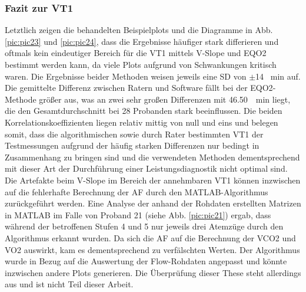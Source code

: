 \subsubsection{Fazit zur VT1}
%
Letztlich zeigen die behandelten Beispielplots und die Diagramme in Abb. \ref{pic:pic23} und \ref{pic:pic24}, dass die Ergebnisse häufiger stark differieren und oftmals kein eindeutiger Bereich für die VT1 mittels V-Slope und \gls{EQO2} bestimmt werden kann, da viele Plots aufgrund von Schwankungen kritisch waren. Die Ergebnisse beider Methoden weisen jeweils eine \gls{SD} von $\pm$14 \si{\per\minute} auf. Die gemittelte Differenz zwischen Ratern und Software fällt bei der \gls{EQO2}-Methode größer aus, was an zwei sehr großen Differenzen mit \SIlist{46,50}{\per\minute} liegt, die den Gesamtdurchschnitt bei 28 Probanden stark beeinflussen. Die beiden Korrelationskoeffizienten liegen relativ mittig von null und eins und belegen somit, dass die algorithmischen sowie durch Rater bestimmten VT1 der Testmessungen aufgrund der häufig starken Differenzen nur bedingt in Zusammenhang zu bringen sind und die verwendeten Methoden dementsprechend mit dieser Art der Durchführung einer Leistungsdiagnostik nicht optimal sind.\\
Die Artefakte beim V-Slope im Bereich der annehmbaren VT1 können inzwischen auf die fehlerhafte Berechnung der \gls{AF} durch den MATLAB-Algorithmus zurückgeführt werden. Eine Analyse der anhand der Rohdaten erstellten Matrizen in MATLAB im Falle von Proband 21 (siehe Abb. \ref{pic:pic21}) ergab, dass während der betroffenen Stufen 4 und 5 nur jeweils drei Atemzüge durch den Algorithmus erkannt wurden. Da sich die \gls{AF} auf die Berechnung der \gls{VCO2} und \gls{VO2} auswirkt, kam es dementsprechend zu verfälschten Werten. Der Algorithmus wurde in Bezug auf die Auswertung der Flow-Rohdaten angepasst und könnte inzwischen andere Plots generieren. Die Überprüfung dieser These steht allerdings aus und ist nicht Teil dieser Arbeit.
%
